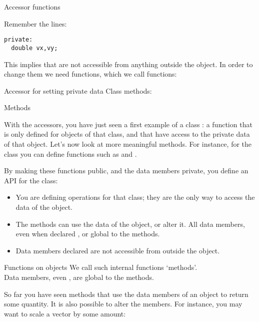  {Accessor functions}

Remember the lines:
\begin{verbatim}
private:
  double vx,vy;
\end{verbatim}
This implies that  are not accessible from anything outside
the object. In order to change them we need functions, which we call
 functions:

\begin{block}{Accessor for setting private data}
  \label{sl:class-private-set}
  Class methods:
\end{block}

 {Methods}

With the accessors, you have just seen a first example of a class
: a function that is only defined for objects of
that class, and that have access to the private data of that object.
Let's now look at more meaningful methods. For instance, for the
 class you can define functions such as  and
. 
%

By making these functions public, and the data members
private, you define an \acf{API} for the class:
\begin{itemize}
\item You are defining operations for that class; they are the only
  way to access the data of the object.
\item The methods can use the data of the object, or alter it. All
  data members, even when declared , or global to the methods.
\item  Data members declared  are not accessible from outside the
  object.
\end{itemize}

\begin{slide}{Functions on objects}
  \label{sl:obj-func}
  We call such internal functions `methods'.\\
  Data members, even , are global to the methods.
\end{slide}

So far you have seen methods that use the data members of an object to
return some quantity. It is also possible to alter the members. 
For instance, you may want to scale a vector by some amount:
%

